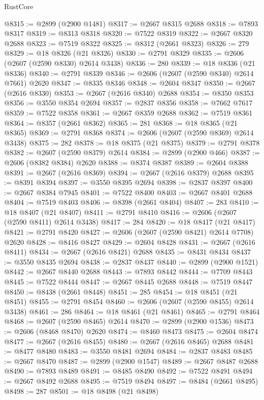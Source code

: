\begin{lexlean}{RustCore}
\begin{coremodule}
@8315 := @2899 (@2900 @1481)
@8317 := @2667 @8315 @2688
@8318 := @7893 @8317
@8319 := @8313 @8318
@8320 := @7522 @8319
@8322 := @2667 @8320 @2688
@8323 := @7519 @8322
@8325 := @8312 (@2661 @8323)
@8326 := 279
@8329 := @18 @8326 (@21 @8326)
@8330 := @2791 @8329
@8335 := @2606 (@2607 (@2590 @8330) @2614 @3438)
@8336 := 280
@8339 := @18 @8336 (@21 @8336)
@8340 := @2791 @8339
@8346 := @2606 (@2607 (@2590 @8340) @2614 @7661) @2620
@8347 := @8335 @8346
@8348 := @2604 @8347
@8350 := @2667 (@2616 @8330)
@8353 := @2667 (@2616 @8340) @2688
@8354 := @8350 @8353
@8356 := @3550 @8354 @2694
@8357 := @2837 @8356
@8358 := @7662 @7617
@8359 := @7522 @8358
@8361 := @2667 @8359 @2688
@8362 := @7519 @8361
@8364 := @8357 (@2661 @8362)
@8365 := 281
@8368 := @18 @8365 (@21 @8365)
@8369 := @2791 @8368
@8374 := @2606 (@2607 (@2590 @8369) @2614 @3438)
@8375 := 282
@8378 := @18 @8375 (@21 @8375)
@8379 := @2791 @8378
@8382 := @2607 (@2590 @8379) @2614
@8384 := @2899 (@2900 @466)
@8387 := @2606 (@8382 @8384) @2620
@8388 := @8374 @8387
@8389 := @2604 @8388
@8391 := @2667 (@2616 @8369)
@8394 := @2667 (@2616 @8379) @2688
@8395 := @8391 @8394
@8397 := @3550 @8395 @2694
@8398 := @2837 @8397
@8400 := @2667 @8384 @7945
@8401 := @7522 @8400
@8403 := @2667 @8401 @2688
@8404 := @7519 @8403
@8406 := @8398 (@2661 @8404)
@8407 := 283
@8410 := @18 @8407 (@21 @8407)
@8411 := @2791 @8410
@8416 := @2606 (@2607 (@2590 @8411) @2614 @3438)
@8417 := 284
@8420 := @18 @8417 (@21 @8417)
@8421 := @2791 @8420
@8427 := @2606 (@2607 (@2590 @8421) @2614 @7708) @2620
@8428 := @8416 @8427
@8429 := @2604 @8428
@8431 := @2667 (@2616 @8411)
@8434 := @2667 (@2616 @8421) @2688
@8435 := @8431 @8434
@8437 := @3550 @8435 @2694
@8438 := @2837 @8437
@8440 := @2899 (@2900 @1521)
@8442 := @2667 @8440 @2688
@8443 := @7893 @8442
@8444 := @7709 @8443
@8445 := @7522 @8444
@8447 := @2667 @8445 @2688
@8448 := @7519 @8447
@8450 := @8438 (@2661 @8448)
@8451 := 285
@8454 := @18 @8451 (@21 @8451)
@8455 := @2791 @8454
@8460 := @2606 (@2607 (@2590 @8455) @2614 @3438)
@8461 := 286
@8464 := @18 @8461 (@21 @8461)
@8465 := @2791 @8464
@8468 := @2607 (@2590 @8465) @2614
@8470 := @2899 (@2900 @1536)
@8473 := @2606 (@8468 @8470) @2620
@8474 := @8460 @8473
@8475 := @2604 @8474
@8477 := @2667 (@2616 @8455)
@8480 := @2667 (@2616 @8465) @2688
@8481 := @8477 @8480
@8483 := @3550 @8481 @2694
@8484 := @2837 @8483
@8485 := @2667 @8470
@8487 := @2899 (@2900 @1547)
@8489 := @2667 @8487 @2688
@8490 := @7893 @8489
@8491 := @8485 @8490
@8492 := @7522 @8491
@8494 := @2667 @8492 @2688
@8495 := @7519 @8494
@8497 := @8484 (@2661 @8495)
@8498 := 287
@8501 := @18 @8498 (@21 @8498)

\end{coremodule}
\end{lexlean}
